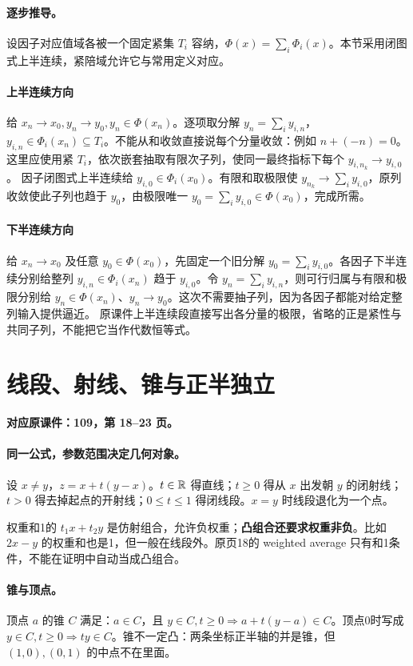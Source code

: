 \paragraph{逐步推导。}
设因子对应值域各被一个固定紧集 $T_i$ 容纳，$\Phi(x)=\sum_i\Phi_i(x)$。本节采用闭图式上半连续，紧陪域允许它与常用定义对应。
\paragraph{上半连续方向}
给 $x_n\to x_0,y_n\to y_0,y_n\in\Phi(x_n)$。逐项取分解 $y_n=\sum_i y_{i,n}$，$y_{i,n}\in\Phi_i(x_n)\subseteq T_i$。不能从和收敛直接说每个分量收敛：例如 $n+(-n)=0$。这里应使用紧 $T_i$，依次嵌套抽取有限次子列，使同一最终指标下每个 $y_{i,n_k}\to y_{i,0}$。
因子闭图式上半连续给 $y_{i,0}\in\Phi_i(x_0)$。有限和取极限使 $y_{n_k}\to\sum_i y_{i,0}$，原列收敛使此子列也趋于 $y_0$，由极限唯一 $y_0=\sum_i y_{i,0}\in\Phi(x_0)$，完成所需。
\paragraph{下半连续方向}
给 $x_n\to x_0$ 及任意 $y_0\in\Phi(x_0)$，先固定一个旧分解 $y_0=\sum_i y_{i,0}$。各因子下半连续分别给整列 $y_{i,n}\in\Phi_i(x_n)$ 趋于 $y_{i,0}$。令 $y_n=\sum_i y_{i,n}$，则可行归属与有限和极限分别给 $y_n\in\Phi(x_n)$、$y_n\to y_0$。这次不需要抽子列，因为各因子都能对给定整列输入提供逼近。
原课件上半连续段直接写出各分量的极限，省略的正是紧性与共同子列，不能把它当作代数恒等式。


\clearpage\section{线段、射线、锥与正半独立}\label{g:109:18}

\textbf{对应原课件：109，第 18--23 页。}


\paragraph{同一公式，参数范围决定几何对象。}
设 $x\ne y$，$z=x+t(y-x)$。$t\in\mathbb{R}$ 得直线；$t\ge0$ 得从 $x$ 出发朝 $y$ 的闭射线；$t>0$ 得去掉起点的开射线；$0\le t\le1$ 得闭线段。$x=y$ 时线段退化为一个点。

权重和1的 $t_1x+t_2y$ 是仿射组合，允许负权重；\textbf{凸组合还要求权重非负}。比如 $2x-y$ 的权重和也是1，但一般在线段外。原页18的 weighted average 只有和1条件，不能在证明中自动当成凸组合。
\paragraph{锥与顶点。}
顶点 $a$ 的锥 $C$ 满足：$a\in C$，且 $y\in C,t\ge0\Rightarrow a+t(y-a)\in C$。顶点0时写成 $y\in C,t\ge0\Rightarrow ty\in C$。锥不一定凸：两条坐标正半轴的并是锥，但 $(1,0),(0,1)$ 的中点不在里面。
